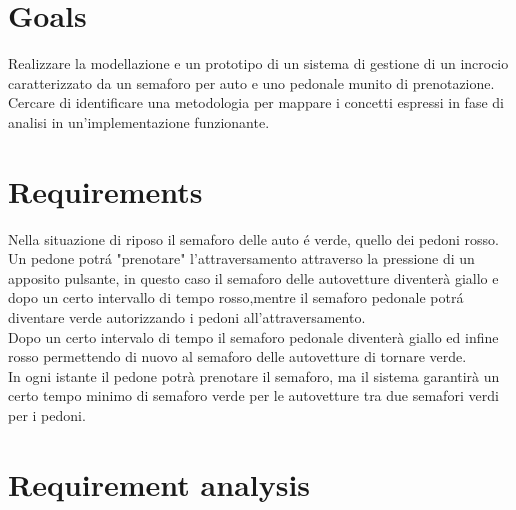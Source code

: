 \documentclass{llncs}
\newcommand{\labelsec}[1]{\label{sec:#1}}
\begin{document}
\section{Goals}
\labelsec{Goals}
Realizzare la modellazione e un prototipo di un sistema di gestione di un incrocio caratterizzato da un semaforo per auto e uno pedonale munito di prenotazione. Cercare di identificare una metodologia per mappare i concetti espressi in fase di analisi in un'implementazione funzionante.

\section{Requirements}
\labelsec{Requirements}
Nella situazione di riposo il semaforo delle auto \'e verde, quello dei pedoni rosso. \\
Un pedone potr\'a "prenotare" l'attraversamento attraverso la pressione di un apposito pulsante, in questo caso il semaforo delle autovetture diventerà giallo e dopo un certo intervallo di tempo rosso,mentre il semaforo pedonale potr\'a diventare verde autorizzando i pedoni all'attraversamento.\\
Dopo un certo intervalo di tempo il semaforo pedonale diventerà giallo ed infine rosso permettendo di nuovo al semaforo delle autovetture di tornare verde.\\
In ogni istante il pedone potrà prenotare il semaforo, ma il sistema garantirà un certo tempo minimo di semaforo verde per le autovetture tra due semafori verdi per i pedoni. 

 
\section{Requirement analysis}
\labelsec{ReqAnalysis}

\end{document}
